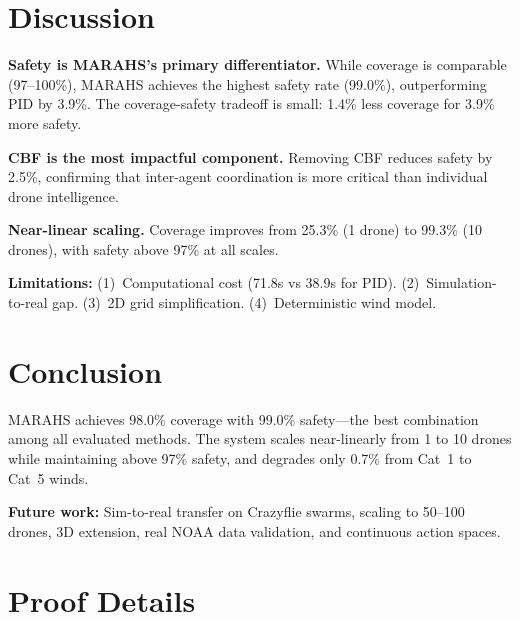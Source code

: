 \documentclass[11pt,twocolumn]{article}
\theoremstyle{definition}
\begin{document}
\section{Discussion}
\label{sec:discussion}

\textbf{Safety is MARAHS's primary differentiator.} While coverage is comparable (97--100\%), MARAHS achieves the highest safety rate (99.0\%), outperforming PID by 3.9\%. The coverage-safety tradeoff is small: 1.4\% less coverage for 3.9\% more safety.

\textbf{CBF is the most impactful component.} Removing CBF reduces safety by 2.5\%, confirming that inter-agent coordination is more critical than individual drone intelligence.

\textbf{Near-linear scaling.} Coverage improves from 25.3\% (1 drone) to 99.3\% (10 drones), with safety above 97\% at all scales.

\textbf{Limitations:} (1)~Computational cost (71.8s vs 38.9s for PID). (2)~Simulation-to-real gap. (3)~2D grid simplification. (4)~Deterministic wind model.

\section{Conclusion}
\label{sec:conclusion}

MARAHS achieves 98.0\% coverage with 99.0\% safety---the best combination among all evaluated methods. The system scales near-linearly from 1 to 10 drones while maintaining above 97\% safety, and degrades only 0.7\% from Cat~1 to Cat~5 winds.

\textbf{Future work:} Sim-to-real transfer on Crazyflie swarms, scaling to 50--100 drones, 3D extension, real NOAA data validation, and continuous action spaces.



\appendix
\section{Proof Details}
\end{document}

